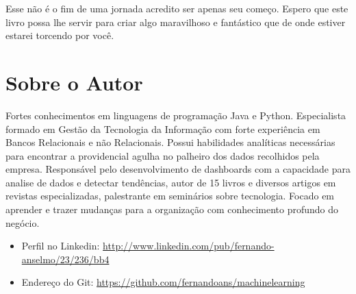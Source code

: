 \documentclass[a4paper,11pt]{book} %
\begin{document}
Esse não é o fim de uma jornada acredito ser apenas seu começo. Espero que este livro possa lhe servir para criar algo maravilhoso e fantástico que de onde estiver estarei torcendo por você.

\section{Sobre o Autor}
Fortes conhecimentos em linguagens de programação Java e Python. Especialista formado em Gestão da Tecnologia da Informação com forte experiência em Bancos Relacionais e não Relacionais. Possui habilidades analíticas necessárias para encontrar a providencial agulha no palheiro dos dados recolhidos pela empresa. Responsável pelo desenvolvimento de dashboards com a capacidade para analise de dados e detectar tendências, autor de 15 livros e diversos artigos em revistas especializadas, palestrante em seminários sobre tecnologia. Focado em aprender e trazer mudanças para a organização com conhecimento profundo do negócio.
\begin{itemize}
 \item Perfil no Linkedin: \url{http://www.linkedin.com/pub/fernando-anselmo/23/236/bb4}
 \item Endereço do Git: \url{https://github.com/fernandoans/machinelearning} 
\end{itemize}

\clearpage
\begingroup
\thispagestyle{empty}
\vfill
\endgroup


\end{document}
